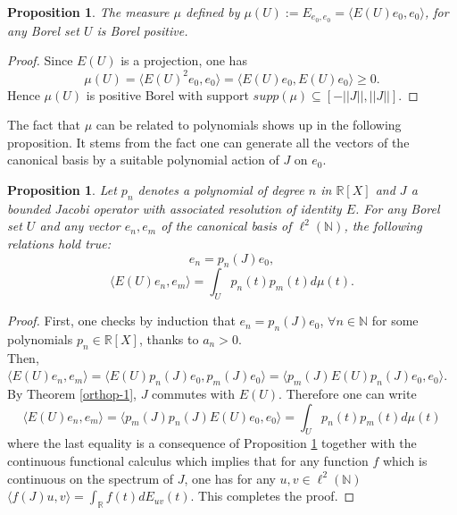 \documentclass[a4paper,11pt,twoside]{article}
\numberwithin{equation}{section}
\newtheorem{proposition}[Theorem]{Proposition}
\theoremstyle{nonumberplain}
\newtheorem{proof}{Proof}
\newcounter{and}
\begin{document}
\begin{proposition}\label{measure-proba}
The measure $\mu$ defined by $\mu(U):=E_{e_0,e_0}=\langle E(U)e_0,e_0 \rangle$, for any Borel set $U$ is Borel positive.
\end{proposition}
\begin{proof}
Since $E(U)$ is a projection, one has 
\begin{equation}
\mu(U)=\langle E(U)^2e_0,e_0  \rangle=\langle E(U)e_0,E(U)e_0\rangle\ge0. 
\end{equation}
Hence $\mu(U)$ is positive Borel with support $supp(\mu)\subseteq[-||J||,||J||]$. 
\end{proof}
The fact that $\mu$ can be related to polynomials shows up in the following proposition. It stems from the fact one can generate all the vectors of the canonical basis by a suitable polynomial action of $J$ on $e_0$.
\begin{proposition}\label{matrixelem-spectral-meas}
Let $p_n$ denotes a polynomial of degree $n$ in $\mathbb{R}[X]$ and $J$ a bounded Jacobi operator with associated resolution of identity $E$. For any Borel set $U$ and any vector $e_n,e_m$ of the canonical basis of $\ell^2(\mathbb{N})$, the following relations hold true:
\begin{equation}
e_n=p_n(J)e_0,
\end{equation}
\begin{equation}
\langle E(U)e_n,e_m \rangle=\int_{U}p_n(t)p_m(t)d\mu(t).
\end{equation}
\end{proposition}
\begin{proof}
First, one checks by induction that $e_n=p_n(J)e_0$, $\forall n\in\mathbb{N}$ for some polynomials $p_n\in\mathbb{R}[X]$, thanks to $a_n>0$. \\
Then, $\langle E(U)e_n,e_m \rangle=\langle E(U)p_n(J)e_0,p_m(J)e_0\rangle=\langle p_m(J)E(U)p_n(J)e_0,e_0\rangle$. By Theorem \ref{orthop-1}, $J$ commutes with $E(U)$. Therefore one can write 
\begin{equation}
\langle E(U)e_n,e_m \rangle=\langle p_m(J)p_n(J)E(U)e_0,e_0\rangle=\int_{U}p_n(t)p_m(t)d\mu(t)
\end{equation}
where the last equality is a consequence of Proposition \ref{measure-proba} together with the continuous functional calculus which implies that for any function $f$ which is continuous on the spectrum of $J$, one has for any $u,v\in\ell^2(\mathbb{N})$ $\langle f(J)u,v\rangle=\int_\mathbb{R}f(t)dE_{uv}(t)$. This completes the proof.
\end{proof}
\end{document}
